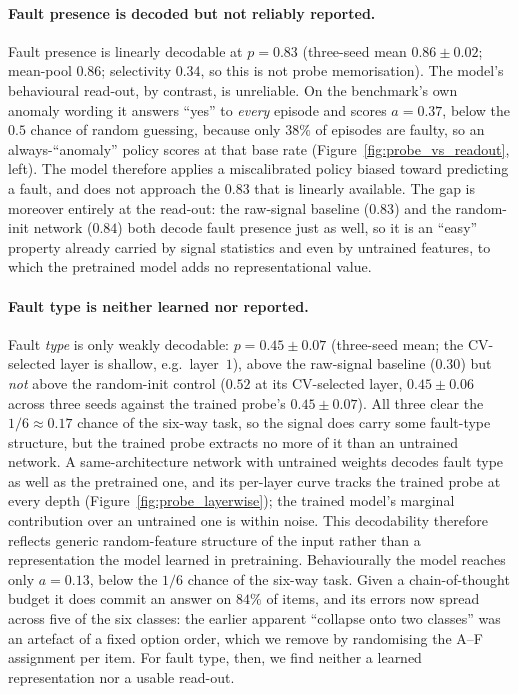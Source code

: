 \paragraph{Fault presence is decoded but not reliably reported.} Fault presence is linearly decodable at $p{=}0.83$ (three-seed mean $0.86{\pm}0.02$; mean-pool $0.86$; selectivity $0.34$, so this is not probe memorisation). The model's behavioural read-out, by contrast, is unreliable. On the benchmark's own anomaly wording it answers ``yes'' to \emph{every} episode and scores $a{=}0.37$, below the $0.5$ chance of random guessing, because only $38\%$ of episodes are faulty, so an always-``anomaly'' policy scores at that base rate (Figure~\ref{fig:probe_vs_readout}, left). The model therefore applies a miscalibrated policy biased toward predicting a fault, and does not approach the $0.83$ that is linearly available. The gap is moreover entirely at the read-out: the raw-signal baseline ($0.83$) and the random-init network ($0.84$) both decode fault presence just as well, so it is an ``easy'' property already carried by signal statistics and even by untrained features, to which the pretrained model adds no representational value.

\paragraph{Fault type is neither learned nor reported.} Fault \emph{type} is only weakly decodable: $p{=}0.45{\pm}0.07$ (three-seed mean; the CV-selected layer is shallow, e.g.\ layer~$1$), above the raw-signal baseline ($0.30$) but \emph{not} above the random-init control ($0.52$ at its CV-selected layer, $0.45{\pm}0.06$ across three seeds against the trained probe's $0.45{\pm}0.07$). All three clear the $1/6{\approx}0.17$ chance of the six-way task, so the signal does carry some fault-type structure, but the trained probe extracts no more of it than an untrained network. A same-architecture network with untrained weights decodes fault type as well as the pretrained one, and its per-layer curve tracks the trained probe at every depth (Figure~\ref{fig:probe_layerwise}); the trained model's marginal contribution over an untrained one is within noise. This decodability therefore reflects generic random-feature structure of the input rather than a representation the model learned in pretraining. Behaviourally the model reaches only $a{=}0.13$, below the $1/6$ chance of the six-way task. Given a chain-of-thought budget it does commit an answer on $84\%$ of items, and its errors now spread across five of the six classes: the earlier apparent ``collapse onto two classes'' was an artefact of a fixed option order, which we remove by randomising the A--F assignment per item. For fault type, then, we find neither a learned representation nor a usable read-out.

